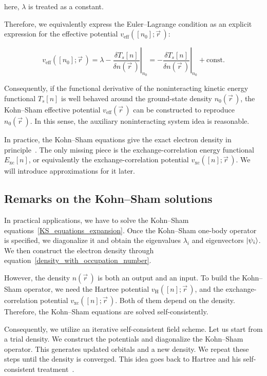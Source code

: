 here, $\lambda$ is treated as a constant.

Therefore, we equivalently express the Euler--Lagrange condition as an explicit expression for the effective potential $v_\mathrm{eff}([n_0];\vec{r}\,)$:

\begin{equation}
    v_\mathrm{eff}([n_0];\vec{r}\,)
    = \lambda-\left.\frac{\delta T_s[n]}{\delta n(\vec{r}\,)}\right|_{n_0}
    = -\left.\frac{\delta T_s[n]}{\delta n(\vec{r}\,)}\right|_{n_0}+\mathrm{const.}
\label{KS_auxiliary_v_eff_from_Ts}
\end{equation}

Consequently, if the functional derivative of the noninteracting kinetic energy functional $T_s[n]$ is well behaved around the ground-state density $n_0(\vec{r}\,)$,
the Kohn--Sham effective potential $v_\mathrm{eff}(\vec{r}\,)$ can be constructed to reproduce $n_0(\vec{r}\,)$.
In this sense, the auxiliary noninteracting system idea is reasonable.

In practice, the Kohn--Sham equations give the exact electron density in principle~\cite{wagner2014kohn}.
The only missing piece is the exchange-correlation energy functional $E_\mathrm{xc}[n]$, or equivalently the exchange-correlation potential $v_\mathrm{xc}([n];\vec{r}\,)$.
We will introduce approximations for it later.

\subsection{Remarks on the Kohn--Sham solutions}

In practical applications, we have to solve the Kohn--Sham equations~\eqref{KS_equations_expansion}.
Once the Kohn--Sham one-body operator is specified,
we diagonalize it and obtain the eigenvalues $\lambda_i$ and eigenvectors $\ket{\psi_i}$.
We then construct the electron density through equation~\eqref{density_with_occupation_number}.

However, the density $n(\vec{r}\,)$ is both an output and an input.
To build the Kohn--Sham operator, we need the Hartree potential $v_\mathrm{H}([n];\vec{r}\,)$,
and the exchange-correlation potential $v_\mathrm{xc}([n];\vec{r}\,)$.
Both of them depend on the density.
Therefore, the Kohn--Sham equations are solved self-consistently.

Consequently, we utilize an iterative self-consistent field scheme.
Let us start from a trial density.
We construct the potentials and diagonalize the Kohn--Sham operator.
This generates updated orbitals and a new density.
We repeat these steps until the density is converged.
This idea goes back to Hartree and his self-consistent treatment~\cite{hartree1928wave}.

